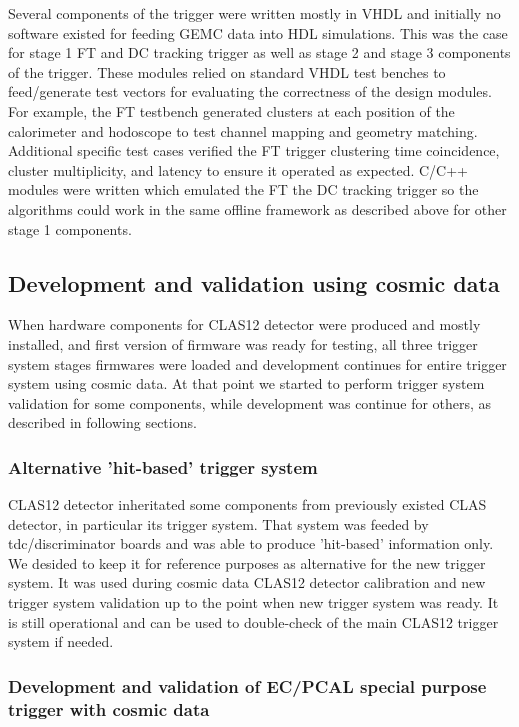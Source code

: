 Several components of the trigger were written mostly in VHDL and initially no software existed for feeding GEMC data into HDL simulations. This was the case for stage 1 FT and DC tracking trigger as well as stage 2 and stage 3 components of the trigger. These modules relied on standard VHDL test benches to feed/generate test vectors for evaluating the correctness of the design modules. For example, the FT testbench generated clusters at each position of the calorimeter and hodoscope to test channel mapping and geometry matching. Additional specific test cases verified the FT trigger clustering time coincidence, cluster multiplicity, and latency to ensure it operated as expected. C/C++ modules were written which emulated the FT the DC tracking trigger so the algorithms could work in the same offline framework as described above for other stage 1 components.

\subsection{Development and validation using cosmic data}

When hardware components for CLAS12 detector were produced and mostly installed, and first version of firmware was ready for testing, all three trigger system stages firmwares were loaded and development continues for entire trigger system using cosmic data. At that point we started to perform trigger system validation for some components, while development was continue for others, as described in following sections.

\subsubsection{Alternative 'hit-based' trigger system}

CLAS12 detector inheritated some components from previously existed CLAS detector, in particular its trigger system. That system was feeded by tdc/discriminator boards and was able to produce 'hit-based' information only. We desided to keep it for reference purposes as alternative for the new trigger system. It was used during cosmic data CLAS12 detector calibration and new trigger system validation up to the point when new trigger system was ready. It is still operational and can be used to double-check of the main CLAS12 trigger system if needed.

\subsubsection{Development and validation of EC/PCAL special purpose trigger with cosmic data}


